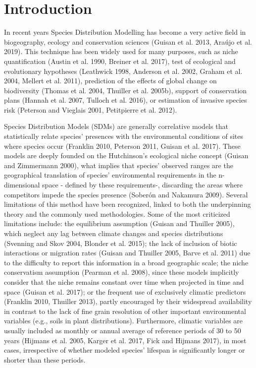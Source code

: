 \documentclass[11pt,twoside]{reedthesis}
\begin{document}
\newpage

\section{Introduction}\label{introduction-2}

In recent years Species Distribution Modelling has become a very active
field in biogeography, ecology and conservation sciences (Guisan et al.
2013, Araújo et al. 2019). This technique has been widely used for many
purposes, such as niche quantification (Austin et al. 1990, Breiner et
al. 2017), test of ecological and evolutionary hypotheses (Leathwick
1998, Anderson et al. 2002, Graham et al. 2004, Mellert et al. 2011),
prediction of the effects of global change on biodiversity (Thomas et
al. 2004, Thuiller et al. 2005b), support of conservation plans (Hannah
et al. 2007, Tulloch et al. 2016), or estimation of invasive species
risk (Peterson and Vieglais 2001, Petitpierre et al. 2012).\par

Species Distribution Models (SDMs) are generally correlative models that
statistically relate species' presences with the environmental
conditions of sites where species occur (Franklin 2010, Peterson 2011,
Guisan et al. 2017). These models are deeply founded on the Hutchinson's
ecological niche concept (Guisan and Zimmermann 2000), what implies that
species' observed ranges are the geographical translation of species'
environmental requirements in the n-dimensional space - defined by these
requirements-, discarding the areas where competitors impede the species
presence (Soberón and Nakamura 2009). Several limitations of this method
have been recognized, linked to both the underpinning theory and the
commonly used methodologies. Some of the most criticized limitations
include: the equilibrium assumption (Guisan and Thuiller 2005), which
neglect any lag between climate changes and species distributions
(Svenning and Skov 2004, Blonder et al. 2015); the lack of inclusion of
biotic interactions or migration rates (Guisan and Thuiller 2005, Barve
et al. 2011) due to the difficulty to report this information in a broad
geographic scale; the niche conservatism assumption (Pearman et al.
2008), since these models implicitly consider that the niche remains
constant over time when projected in time and space (Guisan et al.
2017); or the frequent use of exclusively climatic predictors (Franklin
2010, Thuiller 2013), partly encouraged by their widespread availability
in contrast to the lack of fine grain resolution of other important
environmental variables (e.g., soils in plant distributions).
Furthermore, climatic variables are usually included as monthly or
annual average of reference periods of 30 to 50 years (Hijmans et al.
2005, Karger et al. 2017, Fick and Hijmans 2017), in most cases,
irrespective of whether modeled species' lifespan is significantly
longer or shorter than these periods.\par
\end{document}
